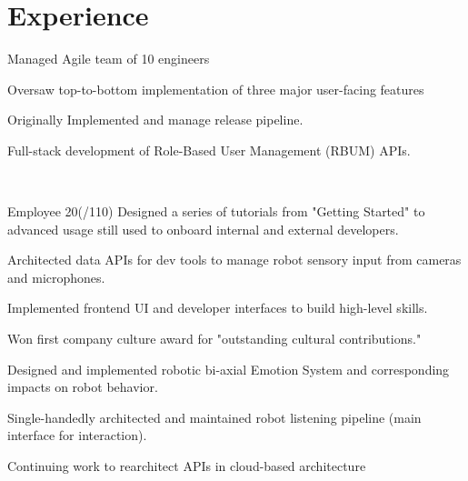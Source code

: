 \documentclass[]{csaund_resume-openfont}
\begin{document}
\begin{minipage}[t]{0.66\textwidth}


\section{Experience}

\vspace{\topsep} %
\begin{tightemize}
\item Managed Agile team of 10 engineers 
\item Oversaw top-to-bottom implementation of three major user-facing features
\end{tightemize}

\begin{tightemize}
\item Originally Implemented and manage release pipeline.
\item Full-stack development of Role-Based User Management (RBUM) APIs.
\end{tightemize}
\sectionsep

 \\
\begin{tightemize}
\item Employee 20(/110) Designed a series of tutorials from "Getting Started" to advanced usage still used to onboard internal and external developers.
\item Architected data APIs for dev tools to manage robot sensory input from cameras and microphones.
\item Implemented frontend UI and developer interfaces to build high-level skills.
\item Won first company culture award for "outstanding cultural contributions."
\end{tightemize}
\begin{tightemize}
\item Designed and implemented robotic bi-axial Emotion System and corresponding impacts on robot behavior.
\item Single-handedly architected and maintained robot listening pipeline (main interface for interaction).
\end{tightemize}
\begin{tightemize}
\item Continuing work to rearchitect APIs in cloud-based architecture
\end{tightemize}
\sectionsep


\end{minipage}
\end{document}
